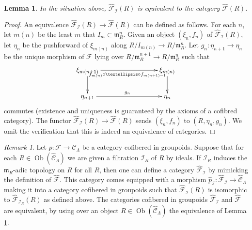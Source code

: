 \documentclass{stacks-project}
\theoremstyle{plain}
\newtheorem{lemma}[subsection]{Lemma}
\theoremstyle{definition}
\theoremstyle{remark}
\newtheorem{remark}[subsection]{Remark}
\numberwithin{equation}{subsection}
\def\Ob{\mathop{\mathrm{Ob}}\nolimits}
\begin{document}
\begin{lemma}
\label{lemma-formal-objects-different-filtration}
In the situation above, $\widehat{\mathcal{F}}_\mathcal{I}(R)$ is equivalent
to the category $\widehat{\mathcal{F}}(R)$.
\end{lemma}

\begin{proof}
An equivalence
$\widehat{\mathcal{F}}_\mathcal{I}(R) \to \widehat{\mathcal{F}}(R)$
can be defined as follows.  For each $n$, let $m(n)$ be the least $m$
that $I_m \subset \mathfrak m_R^n$.  Given an object
$(\xi_n, f_n)$ of $\widehat{\mathcal{F}}_\mathcal{I}(R)$, let
$\eta_n$ be the pushforward of $\xi_{m(n)}$ along
$R/I_{m(n)} \to R/\mathfrak m_R^n$. Let $g_n : \eta_{n + 1} \to \eta_n$
be the unique morphism of $\mathcal{F}$ lying over
$R/\mathfrak m_R^{n + 1} \to R/\mathfrak m_R^n$ such that
$$
\xymatrix{
\xi_{m(n + 1)} \ar[rrr]_{f_{m(n)} \circ \ldots \circ f_{m(n + 1) - 1}} \ar[d]
& & & \xi_{m(n)} \ar[d] \\
\eta_{n + 1} \ar[rrr]^{g_n} & & & \eta_n
}
$$
commutes (existence and uniqueness is guaranteed by the axioms of a
cofibred category). The functor
$\widehat{\mathcal{F}}_\mathcal{I}(R) \to \widehat{\mathcal{F}}(R)$
sends $(\xi_n, f_n)$ to $(R, \eta_n, g_n)$. We omit the
verification that this is indeed an equivalence of categories.
\end{proof}

\begin{remark}
\label{remark-different-sequence-ideals}
Let $p : \mathcal{F} \to \mathcal{C}_\Lambda$ be a category cofibered in
groupoids. Suppose that for each
$R \in \Ob(\widehat{\mathcal{C}}_\Lambda)$ we are given a filtration
$\mathcal{I}_R$ of $R$ by ideals. If
$\mathcal{I}_R$ induces the $\mathfrak m_R$-adic topology on $R$ for all $R$,
then one can define a category
$\widehat{\mathcal{F}}_\mathcal{I}$ by mimicking
the definition of $\widehat{\mathcal{F}}$. This category comes equipped with a
morphism
$\widehat{p}_\mathcal{I} : \widehat{\mathcal{F}}_\mathcal{I} \to
\widehat{\mathcal{C}}_\Lambda$ making it into a category cofibered in
groupoids such that $\widehat{\mathcal{F}}_\mathcal{I}(R)$ is isomorphic to
$\widehat{\mathcal{F}}_{\mathcal{I}_R}(R)$ as defined above. The categories
cofibered in groupoids $\widehat{\mathcal{F}}_\mathcal{I}$ and
$\widehat{\mathcal{F}}$ are equivalent, by using over an object
$R \in \Ob(\widehat{\mathcal{C}}_\Lambda)$
the equivalence of
Lemma \ref{lemma-formal-objects-different-filtration}.
\end{remark}
\end{document}
